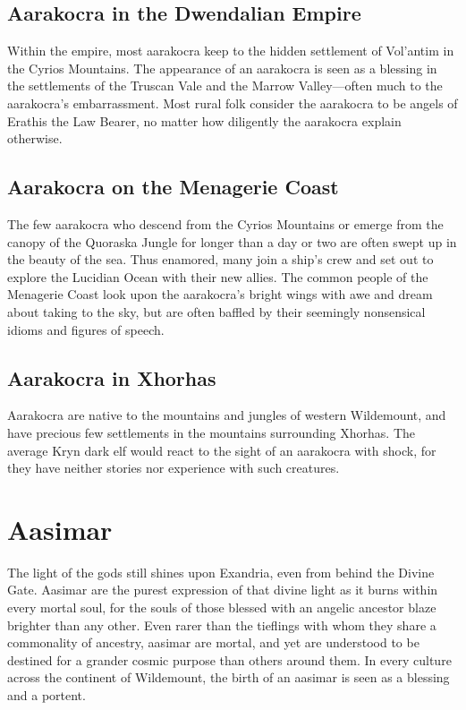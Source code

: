 \documentclass[10pt,a4paper,twoside,bg=print,twocolumn,openany,nodeprecatedcode]{dndbook}
\begin{document}
\subsection{Aarakocra in the Dwendalian Empire}
Within the empire, most aarakocra keep to the hidden settlement of Vol'antim in the Cyrios Mountains. The appearance of an aarakocra is seen as a blessing in the settlements of the Truscan Vale and the Marrow Valley—often much to the aarakocra's embarrassment. Most rural folk consider the aarakocra to be angels of Erathis the Law Bearer, no matter how diligently the aarakocra explain otherwise.

\subsection{Aarakocra on the Menagerie Coast}
The few aarakocra who descend from the Cyrios Mountains or emerge from the canopy of the Quoraska Jungle for longer than a day or two are often swept up in the beauty of the sea. Thus enamored, many join a ship's crew and set out to explore the Lucidian Ocean with their new allies. The common people of the Menagerie Coast look upon the aarakocra's bright wings with awe and dream about taking to the sky, but are often baffled by their seemingly nonsensical idioms and figures of speech.

\subsection{Aarakocra in Xhorhas}
Aarakocra are native to the mountains and jungles of western Wildemount, and have precious few settlements in the mountains surrounding Xhorhas. The average Kryn dark elf would react to the sight of an aarakocra with shock, for they have neither stories nor experience with such creatures.

\section{Aasimar}
The light of the gods still shines upon Exandria, even from behind the Divine Gate. Aasimar are the purest expression of that divine light as it burns within every mortal soul, for the souls of those blessed with an angelic ancestor blaze brighter than any other. Even rarer than the tieflings with whom they share a commonality of ancestry, aasimar are mortal, and yet are understood to be destined for a grander cosmic purpose than others around them. In every culture across the continent of Wildemount, the birth of an aasimar is seen as a blessing and a portent.
\end{document}
